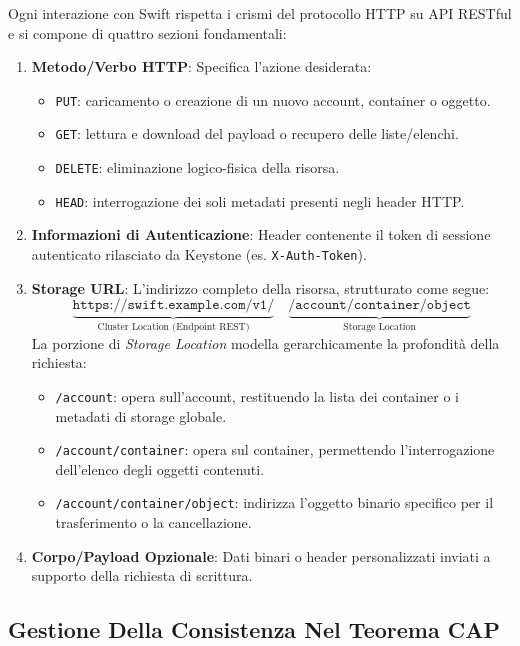 \documentclass[11pt, a4paper]{article}
\begin{document}
Ogni interazione con Swift rispetta i crismi del protocollo HTTP su API RESTful e si compone di quattro sezioni fondamentali:
\begin{enumerate}
    \item \textbf{Metodo/Verbo HTTP}: Specifica l'azione desiderata:
    \begin{itemize}[noitemsep]
        \item \texttt{PUT}: caricamento o creazione di un nuovo account, container o oggetto.
        \item \texttt{GET}: lettura e download del payload o recupero delle liste/elenchi.
        \item \texttt{DELETE}: eliminazione logico-fisica della risorsa.
        \item \texttt{HEAD}: interrogazione dei soli metadati presenti negli header HTTP.
    \end{itemize}
    \item \textbf{Informazioni di Autenticazione}: Header contenente il token di sessione autenticato rilasciato da Keystone (es. \texttt{X-Auth-Token}).
    \item \textbf{Storage URL}: L'indirizzo completo della risorsa, strutturato come segue:
    \[
        \underbrace{\texttt{https://swift.example.com/v1/}}_{\text{Cluster Location (Endpoint REST)}} \quad \underbrace{\texttt{/account/container/object}}_{\text{Storage Location}}
    \]
    La porzione di \emph{Storage Location} modella gerarchicamente la profondità della richiesta:
    \begin{itemize}[noitemsep]
        \item \texttt{/account}: opera sull'account, restituendo la lista dei container o i metadati di storage globale.
        \item \texttt{/account/container}: opera sul container, permettendo l'interrogazione dell'elenco degli oggetti contenuti.
        \item \texttt{/account/container/object}: indirizza l'oggetto binario specifico per il trasferimento o la cancellazione.
    \end{itemize}
    \item \textbf{Corpo/Payload Opzionale}: Dati binari o header personalizzati inviati a supporto della richiesta di scrittura.
\end{enumerate}

\subsection{Gestione Della Consistenza Nel Teorema CAP}
\end{document}
